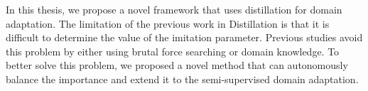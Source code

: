 In this thesis, we propose a novel framework that uses distillation for domain adaptation.
The limitation of the previous work in Distillation is that it is difficult to determine the value of the imitation parameter. Previous studies avoid this problem by either using brutal force searching or domain knowledge. To better solve this problem, we proposed a novel method that can autonomously balance the importance and extend it to the semi-supervised domain adaptation.

